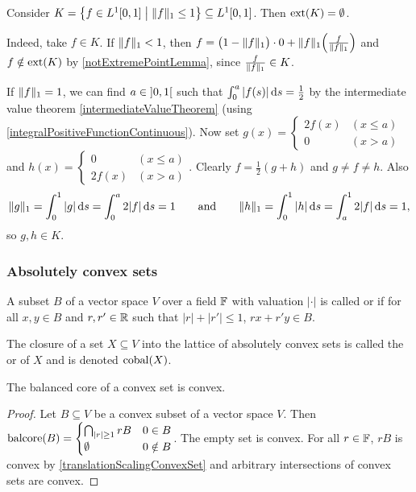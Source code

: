 \begin{example}
Consider $K = \setbuilder{f\in L^1\interval{0,1}}{\norm{f}_1 \leq 1} \subseteq L^1\interval{0,1}$. Then $\operatorname{ext}(K) = \emptyset$.

Indeed, take $f\in K$. If $\lVert f\rVert_1 < 1$, then $f = \big(1-\lVert f\rVert_1\big)\cdot 0 + \lVert f\rVert_1\Big(\frac{f}{\lVert f\rVert_1}\Big)$ and $f\notin \operatorname{ext}(K)$ by \ref{notExtremePointLemma}, since $\frac{f}{\lVert f\rVert_1}\in K$.

If $\lVert f\rVert_1 = 1$, we can find $a\in \interval[o]{0,1}$ such that $\int_0^a |f(s)| \operatorname{d \!}{s} = \frac{1}{2}$ by the intermediate value theorem \ref{intermediateValueTheorem} (using \ref{integralPositiveFunctionContinuous}). Now set $g(x) = \begin{cases}
2f(x) & (x\leq a) \\ 0 & (x>a)
\end{cases}$ and $h(x) = \begin{cases}
0 & (x\leq a) \\ 2f(x) & (x>a)
\end{cases}$. Clearly $f = \frac{1}{2}(g+h)$ and $g\neq f\neq h$. Also
\[ \lVert g\rVert_1 = \int_0^1 |g| \operatorname{d \!}{s} = \int_0^a 2|f|\operatorname{d \!}{s} = 1 \qquad\text{and}\qquad \lVert h\rVert_1 = \int_0^1 |h| \operatorname{d \!}{s} = \int_a^1 2|f|\operatorname{d \!}{s} = 1, \]
so $g,h\in K$.
\end{example}


\subsubsection{Absolutely convex sets}
\begin{definition}
A subset $B$ of a vector space $V$ over a field $\mathbb{F}$ with valuation $|\cdot|$ is called  or  if for all $x,y\in B$ and $r,r'\in \mathbb{R}$ such that $|r| + |r'| \leq 1$, $rx + r'y\in B$.

The closure of a set $X\subseteq V$ into the lattice of absolutely convex sets is called the  or  of $X$ and is denoted $\operatorname{cobal}(X)$.
\end{definition}

\begin{lemma} \label{balancedCoreConvexSet}
The balanced core of a convex set is convex.
\end{lemma}
\begin{proof}
Let $B\subseteq V$ be a convex subset of a vector space $V$. Then
$\operatorname{balcore}(B) = \begin{cases}
\bigcap_{|r|\geq 1}rB & 0\in B\\
\emptyset & 0\notin B
\end{cases}$. The empty set is convex. For all $r\in \mathbb{F}$, $rB$ is convex by \ref{translationScalingConvexSet} and arbitrary intersections of convex sets are convex.
\end{proof}

